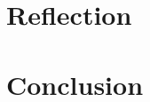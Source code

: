 \chapter{Reflection}
\label{re}

\newpage

\chapter{Conclusion}
\label{co}

\newpage

\label{theend}



\nocite{*}
\label{bib}

\appendix
\appendixpage
% 

\label{pagecount}

\newpage
\listoffixmes
{}


